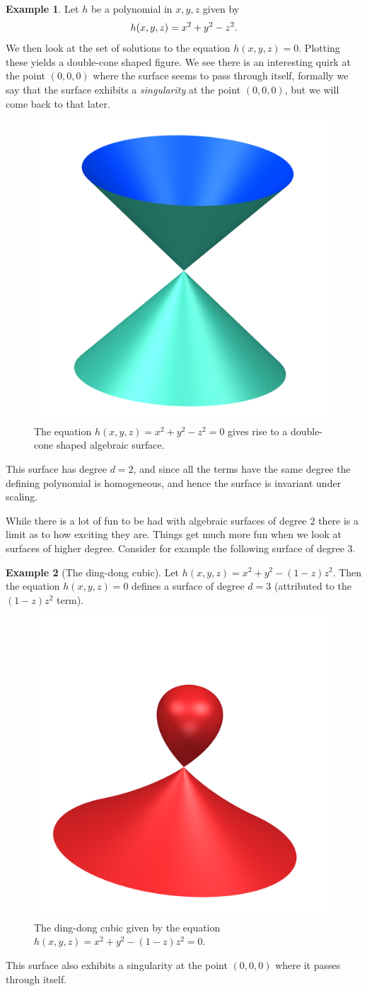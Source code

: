 \documentclass[a4paper]{article}
\theoremstyle{definition}
\newtheorem{exmpl}{Example}
\theoremstyle{plain}
\begin{document}
    \begin{exmpl}
        Let $h$ be a polynomial in $x, y, z$ given by
        \begin{equation}
            \notag h(x, y, z) = x^2 + y^2 - z^2. 
        \end{equation}
        We then look at the set of solutions to the equation $h(x, y, z) = 0$.
        Plotting these yields a double-cone shaped figure. We see there is an
        interesting quirk at the point $(0, 0, 0)$ where the surface seems to
        pass through itself, formally we say that the surface exhibits a
        \emph{singularity} at the point $(0, 0, 0)$, but we will come back to
        that later.
        \begin{figure}[]
            \centering
            \includegraphics[width=0.3\linewidth]{../pictures/double_cone.png}
            \caption{The equation $h(x, y, z) = x^2 + y^2 - z^2 = 0$ gives rise
            to a double-cone shaped algebraic surface.}
            \label{fig:../pictures/double_cone}
        \end{figure}
        This surface has degree $d = 2$, and since all the terms have the same
        degree the defining polynomial is homogeneous, and hence the surface is
        invariant under scaling.  
    \end{exmpl} 
    
    While there is a lot of fun to be had with algebraic surfaces of degree $2$
    there is a limit as to how exciting they are. Things get much more fun when
    we look at surfaces of higher degree. Consider for example the following
    surface of degree $3$.

    \begin{exmpl}[The ding-dong cubic]
        Let $h(x, y, z) = x^2 + y^2 - (1 - z)z^2$. Then the equation $h(x, y,
        z) = 0$ defines a surface of degree $d = 3$ (attributed to the
        $(1-z)z^2$ term). 
        \begin{figure}[]
            \centering
            \includegraphics[width=0.2\linewidth]{../pictures/ding_dong.png}
            \caption{The ding-dong cubic given by the equation $h(x, y, z) =
            x^2 + y^2 - (1-z)z^2 = 0$.}
            \label{fig:../pictures/ding_dong}
        \end{figure}
        This surface also exhibits a singularity at the point $(0, 0, 0)$ where
        it passes through itself.
        \end{exmpl}
    
\end{document}
